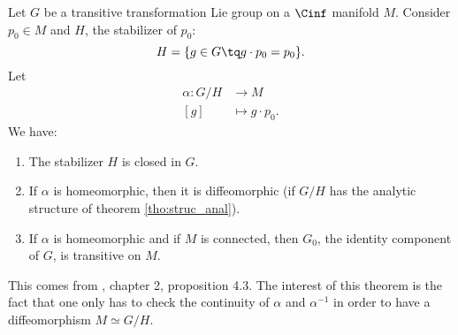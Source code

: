 \begin{proposition}
Let $G$ be a transitive transformation Lie group on a $\Cinf$ manifold $M$. Consider $p_0\in M$ and $H$, the stabilizer of $p_{0}$:
\[
  H=\{ g\in G\tq g\cdot p_0=p_0 \}.
\]
Let
\begin{equation}
\begin{aligned}
 \alpha\colon G/H&\to M \\ 
[g]&\mapsto g\cdot p_{0}.
\end{aligned}
\end{equation}
We have:
\begin{enumerate}
\item The stabilizer $H$ is closed in $G$.
\item If $\alpha$ is homeomorphic, then it is diffeomorphic (if $G/H$ has the analytic structure of theorem \ref{tho:struc_anal}).
\item If $\alpha$ is homeomorphic and if $M$ is connected, then $G_0$, the identity component of $G$, is transitive on $M$.
\end{enumerate}
\label{propHelgason4.3}
\end{proposition}

This comes from \cite{Helgason}, chapter 2, proposition 4.3. The interest of this theorem is the fact that one only has to check the continuity of $\alpha$ and $\alpha^{-1}$ in order to have a diffeomorphism $M\simeq G/H$.

